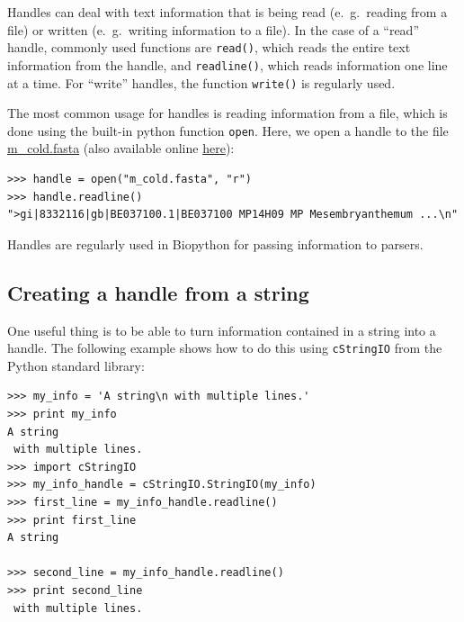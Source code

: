 \documentclass{report}
\begin{document}
Handles can deal with text information that is being read (e.~g.~reading 
from a file) or written (e.~g.~writing information to a file). In the
case of a ``read'' handle, commonly used functions are \verb|read()|,
which reads the entire text information from the handle, and
\verb|readline()|, which reads information one line at a time. For
``write'' handles, the function \verb|write()| is regularly used.


The most common usage for handles is reading information from a file,
which is done using the built-in python function \verb|open|. Here, we open a
handle to the file \href{examples/m\_cold.fasta}{m\_cold.fasta}
(also available online
\href{http://biopython.org/DIST/docs/tutorial/examples/m\_cold.fasta}{here}):

\begin{verbatim}
>>> handle = open("m_cold.fasta", "r")
>>> handle.readline()
">gi|8332116|gb|BE037100.1|BE037100 MP14H09 MP Mesembryanthemum ...\n"
\end{verbatim}

Handles are regularly used in Biopython for passing information to parsers.

\subsection{Creating a handle from a string}

One useful thing is to be able to turn information contained in a
string into a handle. The following example shows how to do this using 
\verb|cStringIO| from the Python standard library:

\begin{verbatim}
>>> my_info = 'A string\n with multiple lines.'
>>> print my_info
A string
 with multiple lines.
>>> import cStringIO
>>> my_info_handle = cStringIO.StringIO(my_info)
>>> first_line = my_info_handle.readline()
>>> print first_line
A string

>>> second_line = my_info_handle.readline()
>>> print second_line
 with multiple lines.
\end{verbatim}
\end{document}
